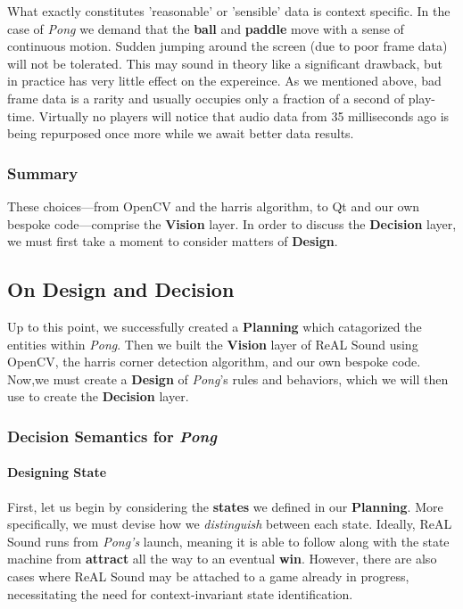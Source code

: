 \documentclass{report}
\newcommand{\rs}{ReAL Sound\xspace}
\newcommand{\plan}{\textbf{Planning}\xspace}
\newcommand{\design}{\textbf{Design}\xspace}
\newcommand{\state}[1]{\textbf{#1}}
\newcommand{\vision}{\textbf{Vision}\xspace}
\newcommand{\decision}{\textbf{Decision}\xspace}
\newcommand{\pad}{\textbf{paddle}\xspace}
\newcommand{\ball}{\textbf{ball}\xspace}
\begin{document}
What exactly constitutes 'reasonable' or 'sensible' data is context specific. In the case of \emph{Pong} we demand that the \ball and \pad move with a sense of continuous motion. Sudden jumping around the screen (due to poor frame data) will not be tolerated. This may sound in theory like a significant drawback, but in practice has very little effect on the expereince. As we mentioned above, bad frame data is a rarity and usually occupies only a fraction of a second of play-time. Virtually no players will notice that audio data from 35 milliseconds ago is being repurposed once more while we await better data results. 

\subsubsection{Summary}
These choices---from OpenCV and the harris algorithm, to Qt and our own bespoke code---comprise the \vision layer. In order to discuss the \decision layer, we must first take a moment to consider matters of \design.

\subsection{On Design and Decision}
Up to this point, we successfully created a \plan which catagorized the entities within \emph{Pong}. Then we built the \vision layer of \rs using OpenCV, the harris corner detection algorithm, and our own bespoke code. Now,we must create a \design of \emph{Pong}'s rules and behaviors, which we will then use to create the \decision layer. 

\subsubsection{Decision Semantics for \emph{Pong}}
\paragraph{Designing State}

First, let us begin by considering the \state{states} we defined in our \plan. More specifically, we must devise how we \emph{distinguish} between each state. Ideally, \rs runs from \emph{Pong's} launch, meaning it is able to follow along with the state machine from \state{attract} all the way to an eventual \state{win}. However, there are also cases where \rs may be attached to a game already in progress, necessitating the need for context-invariant state identification.
\end{document}
